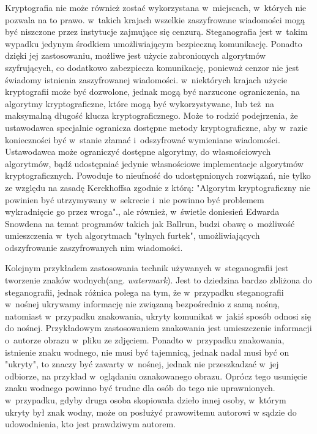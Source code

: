 \documentclass[a4paper, twoside, 12pt]{report}
\begin{document}
        Kryptografia nie może również zostać wykorzystana w~miejscach, w~których
        nie pozwala na to prawo.\cite{CRYPTOGRAFYLAW} w~takich krajach wszelkie
        zaszyfrowane wiadomości mogą być niszczone przez instytucje zajmujące się
        cenzurą. Steganografia jest w~takim
        wypadku jedynym środkiem umożliwiającym bezpieczną komunikację. Ponadto
        dzięki jej zastosowaniu, możliwe jest użycie zabronionych algorytmów szyfrujących,
        co dodatkowo zabezpiecza komunikację, ponieważ cenzor nie jest świadomy
        istnienia zaszyfrowanej wiadomości. w~niektórych krajach użycie kryptografii
        może być dozwolone, jednak mogą być narzucone ograniczenia, na algorytmy
        kryptograficzne, które mogą być wykorzystywane, lub też na maksymalną
        długość klucza kryptograficznego. Może to rodzić podejrzenia, że ustawodawca
        specjalnie ogranicza dostępne metody kryptograficzne, aby w~razie konieczności
        być w~stanie złamać i~odszyfrować wymieniane wiadomości. Ustawodawca
        może ograniczyć dostępne algorytmy, do własnościowych algorytmów, bądź
        udostępniać jedynie własnościowe implementacje algorytmów kryptograficznych.
        Powoduje to nieufność do udostępnionych rozwiązań, nie tylko ze względu
        na zasadę Kerckhoffsa zgodnie z którą:
        "Algorytm kryptograficzny nie powinien być utrzymywany w~sekrecie i~nie powinno
        być problemem wykradnięcie go przez wroga".\cite{KERCKHOS}, ale również,
        w~świetle doniesień Edwarda Snowdena na temat programów takich jak
        Ballrun\cite{WIKI:BALLRUN}, budzi obawę o~możliwość umieszczenia w~tych
        algorytmach "tylnych furtek", umożliwiających odszyfrowanie zaszyfrowanych
        nim wiadomości.

        Kolejnym przykładem zastosowania technik używanych w~steganografii jest
        tworzenie znaków wodnych(ang. \emph{watermark}). Jest to dziedzina bardzo zbliżona do steganografii,
        jednak różnica polega na tym, że w~przypadku steganografii w~nośnej ukrywamy
        informację nie związaną bezpośrednio z samą nośną, natomiast w~przypadku znakowania,
        ukryty komunikat w~jakiś sposób odnosi się do nośnej. Przykładowym zastosowaniem
        znakowania jest umieszczenie informacji o~autorze obrazu w~pliku ze zdjęciem.
        Ponadto w~przypadku znakowania, istnienie znaku wodnego, nie musi być tajemnicą,
        jednak nadal musi być on "ukryty", to znaczy być zawarty w~nośnej, jednak
        nie przeszkadzać w~jej odbiorze, na przykład w~oglądaniu oznakowanego obrazu.
        Oprócz tego usunięcie znaku wodnego powinno być trudne dla osób do tego nie
        uprawnionych. w~przypadku, gdyby druga osoba skopiowała dzieło innej osoby,
        w~którym ukryty był znak wodny, może on posłużyć prawowitemu autorowi w
        sądzie do udowodnienia, kto jest prawdziwym autorem.
\end{document}
